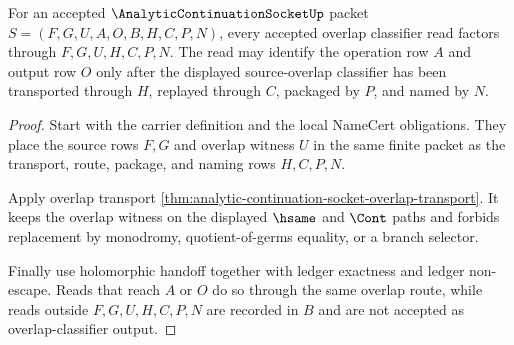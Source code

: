 \begin{theorem}
\label{thm:analytic-continuation-socket-overlap-classifier-route}
For an accepted $\AnalyticContinuationSocketUp$ packet $S=(F,G,U,A,O,B,H,C,P,N)$, every accepted overlap classifier read factors through $F,G,U,H,C,P,N$. The read may identify the operation row $A$ and output row $O$ only after the displayed source-overlap classifier has been transported through $H$, replayed through $C$, packaged by $P$, and named by $N$.
\end{theorem}
\begin{proof}
Start with the carrier definition and the local NameCert obligations. They place the source rows $F,G$ and overlap witness $U$ in the same finite packet as the transport, route, package, and naming rows $H,C,P,N$.

Apply overlap transport \autoref{thm:analytic-continuation-socket-overlap-transport}. It keeps the overlap witness on the displayed $\hsame$ and $\Cont$ paths and forbids replacement by monodromy, quotient-of-germs equality, or a branch selector.

Finally use holomorphic handoff together with ledger exactness and ledger non-escape. Reads that reach $A$ or $O$ do so through the same overlap route, while reads outside $F,G,U,H,C,P,N$ are recorded in $B$ and are not accepted as overlap-classifier output.
\end{proof}

